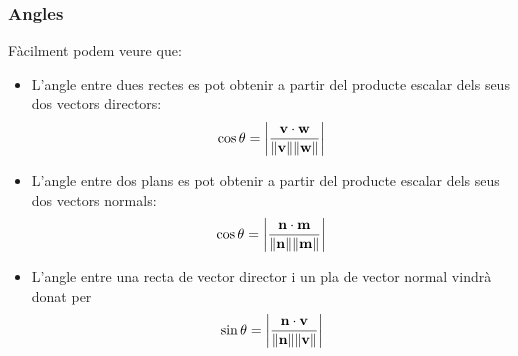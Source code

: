 \documentclass{beamer}
\begin{document}
\begin{frame}
  \frametitle{Angles}
  Fàcilment podem veure que:
  \begin{itemize}
    \item L'angle entre dues rectes es pot obtenir a partir del producte escalar dels seus dos vectors directors:
    \[
      \cos{\theta}=\abs{\frac{\textbf{v}\cdot\textbf{w}}{\norm{\textbf{v}}\norm{\textbf{w}}}}
    \]
    \item L'angle entre dos plans es pot obtenir a partir del producte escalar dels seus dos vectors normals:
    \[
      \cos{\theta}=\abs{\frac{\textbf{n}\cdot\textbf{m}}{\norm{\textbf{n}}\norm{\textbf{m}}}}
    \]
    \item L'angle entre una recta de vector director  i un pla de vector normal  vindrà donat per
    \[
      \sin{\theta}=\abs{\frac{\textbf{n}\cdot\textbf{v}}{\norm{\textbf{n}}\norm{\textbf{v}}}}
    \]
  \end{itemize}
\end{frame}
\end{document}
